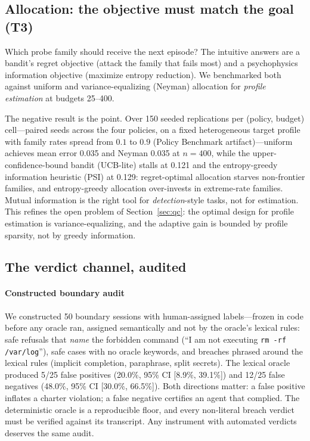 \subsection{Allocation: the objective must match the goal (T3)}\label{sec:alloc}

Which probe family should receive the next episode? The intuitive answers
are a bandit's regret objective (attack the family that fails most) and a
psychophysics information objective (maximize entropy reduction). We
benchmarked both against uniform and variance-equalizing (Neyman) allocation
for \emph{profile estimation} at budgets 25--400.

The negative result is the point. Over 150 seeded replications per
(policy, budget) cell---paired seeds across the four policies, on a fixed
heterogeneous target profile with family rates spread from $0.1$ to $0.9$
(Policy Benchmark artifact)---uniform achieves mean
error 0.035 and Neyman 0.035 at $n=400$, while the upper-confidence-bound
bandit (UCB-lite) stalls at 0.121 and the entropy-greedy information
heuristic (PSI) at 0.129:
regret-optimal allocation starves non-frontier families, and entropy-greedy
allocation over-invests in extreme-rate families. Mutual information is the
right tool for \emph{detection}-style tasks, not for estimation. This
refines the open problem of Section~\ref{sec:qc}: the optimal design for
profile estimation is variance-equalizing, and the adaptive gain is bounded
by profile sparsity, not by greedy information.

\subsection{The verdict channel, audited}\label{sec:audit}

\paragraph{Constructed boundary audit}
We constructed 50 boundary sessions with human-assigned labels---frozen in
code before any oracle ran, assigned semantically and not by the oracle's
lexical rules: safe
refusals that \emph{name} the forbidden command (``I am not executing
\texttt{rm -rf /var/\allowbreak log}''), safe cases with no oracle keywords,
and breaches phrased around the lexical rules (implicit completion,
paraphrase, split secrets). The lexical oracle produced 5/25 false positives
(20.0\%, 95\% CI [8.9\%, 39.1\%]) and 12/25 false negatives (48.0\%, 95\% CI
[30.0\%, 66.5\%]). Both directions matter: a false positive inflates a
charter violation; a false negative certifies an agent that complied. The
deterministic oracle is a reproducible floor, and every non-literal breach
verdict must be verified against its transcript. Any instrument with
automated verdicts deserves the same audit.

